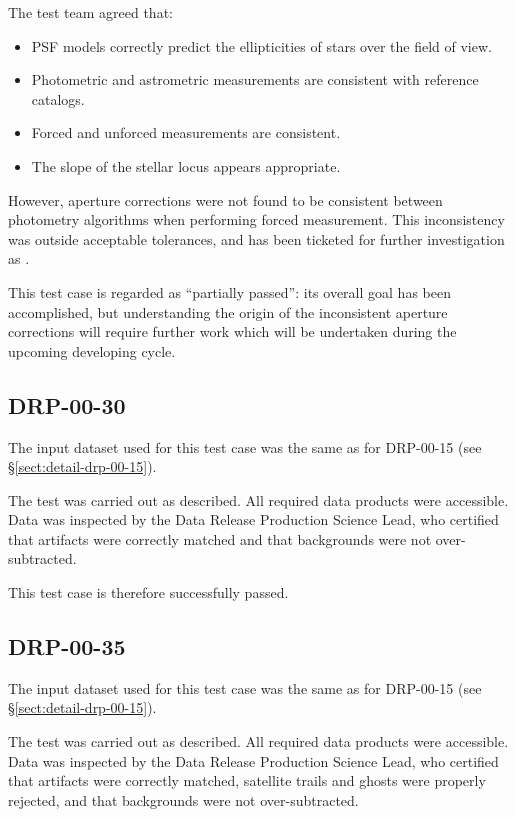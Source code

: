 \documentclass[DM,lsstdraft,STR,toc]{lsstdoc}
\begin{document}
The test team agreed that:

\begin{itemize}

  \item{PSF models correctly predict the ellipticities of stars over the field of view.}
  \item{Photometric and astrometric measurements are consistent with reference catalogs.}
  \item{Forced and unforced measurements are consistent.}
  \item{The slope of the stellar locus appears appropriate.}

\end{itemize}

However, aperture corrections were not found to be consistent between photometry algorithms when performing forced measurement.
This inconsistency was outside acceptable tolerances, and has been ticketed for further investigation as .

This test case is regarded as ``partially passed'': its overall goal has been accomplished, but understanding the origin of the inconsistent aperture corrections will require further work which will be undertaken during the upcoming developing cycle.

\subsection{DRP-00-30}
\label{sect:detail-drp-00-30}

The input dataset used for this test case was the same as for DRP-00-15 (see \S\ref{sect:detail-drp-00-15}).

The test was carried out as described.
All required data products were accessible.
Data was inspected by the Data Release Production Science Lead, who certified that artifacts were correctly matched and that backgrounds were not over-subtracted.

This test case is therefore successfully passed.

\subsection{DRP-00-35}
\label{sect:detail-drp-00-35}

The input dataset used for this test case was the same as for DRP-00-15 (see \S\ref{sect:detail-drp-00-15}).

The test was carried out as described.
All required data products were accessible.
Data was inspected by the Data Release Production Science Lead, who certified that artifacts were correctly matched, satellite trails and ghosts were properly rejected, and that backgrounds were not over-subtracted.
\end{document}
